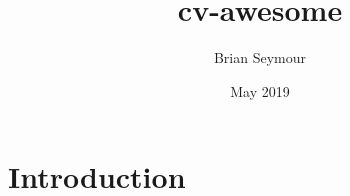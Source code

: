 \documentclass{article}
\title{cv-awesome}
\author{Brian Seymour}
\date{May 2019}
\begin{document}
\maketitle

\section{Introduction}
\end{document}
